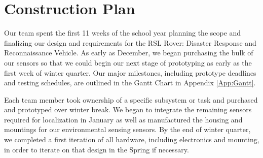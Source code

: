 \chapter{Construction Plan}

Our team spent the first 11 weeks of the school year planning the scope and finalizing our design and requirements for the RSL Rover: Disaster Response and Reconnaissance Vehicle. As early as December, we began purchasing the bulk of our sensors so that we could begin our next stage of prototyping as early as the first week of winter quarter. Our major milestones, including prototype deadlines and testing schedules, are outlined in the Gantt Chart in Appendix \ref{App:Gantt}. 

Each team member took ownership of a specific subsystem or task and purchased and prototyped over winter break. We began to  integrate the remaining sensors required for localization in January as well as manufactured the housing and mountings for our environmental sensing sensors. By the end of winter quarter, we completed a first iteration of all hardware, including electronics and mounting, in order to iterate on that design in the Spring if necessary. 


